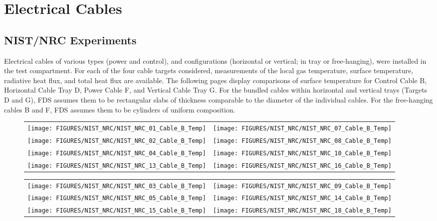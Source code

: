\clearpage


\section{Electrical Cables}


\subsection{NIST/NRC Experiments}

Electrical cables of various types (power and control), and configurations (horizontal or vertical; in tray or free-hanging), were installed in the test compartment. For each of the four cable targets considered, measurements of the local gas temperature, surface temperature, radiative heat flux, and total heat flux are available.  The following pages display comparisons of surface temperature for Control Cable B, Horizontal Cable Tray D, Power Cable F, and Vertical Cable Tray G. For the bundled cables within horizontal and vertical trays (Targets D and G), FDS assumes them to be rectangular slabs of thickness comparable to the diameter of the individual cables. For the free-hanging cables B and F, FDS assumes them to be cylinders of uniform composition.

\newpage

\begin{figure}[p]
\begin{tabular*}{\textwidth}{l@{\extracolsep{\fill}}r}
\texttt{[image: FIGURES/NIST\_NRC/NIST\_NRC\_01\_Cable\_B\_Temp]} &
\texttt{[image: FIGURES/NIST\_NRC/NIST\_NRC\_07\_Cable\_B\_Temp]} \\
\texttt{[image: FIGURES/NIST\_NRC/NIST\_NRC\_02\_Cable\_B\_Temp]} &
\texttt{[image: FIGURES/NIST\_NRC/NIST\_NRC\_08\_Cable\_B\_Temp]} \\
\texttt{[image: FIGURES/NIST\_NRC/NIST\_NRC\_04\_Cable\_B\_Temp]} &
\texttt{[image: FIGURES/NIST\_NRC/NIST\_NRC\_10\_Cable\_B\_Temp]} \\
\texttt{[image: FIGURES/NIST\_NRC/NIST\_NRC\_13\_Cable\_B\_Temp]} &
\texttt{[image: FIGURES/NIST\_NRC/NIST\_NRC\_16\_Cable\_B\_Temp]}
\end{tabular*}
\label{NIST_NRC_Cable_B_Closed}
\end{figure}

\begin{figure}[p]
\begin{tabular*}{\textwidth}{l@{\extracolsep{\fill}}r}
\texttt{[image: FIGURES/NIST\_NRC/NIST\_NRC\_03\_Cable\_B\_Temp]} &
\texttt{[image: FIGURES/NIST\_NRC/NIST\_NRC\_09\_Cable\_B\_Temp]} \\
\texttt{[image: FIGURES/NIST\_NRC/NIST\_NRC\_05\_Cable\_B\_Temp]} &
\texttt{[image: FIGURES/NIST\_NRC/NIST\_NRC\_14\_Cable\_B\_Temp]} \\
\texttt{[image: FIGURES/NIST\_NRC/NIST\_NRC\_15\_Cable\_B\_Temp]} &
\texttt{[image: FIGURES/NIST\_NRC/NIST\_NRC\_18\_Cable\_B\_Temp]}
\end{tabular*}
\label{NIST_NRC_Cable_B_Open}
\end{figure}

